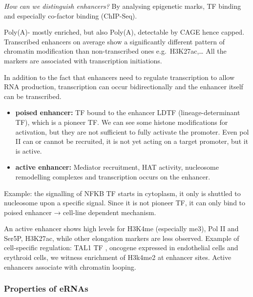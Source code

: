 \emph{How can we distinguish enhancers?} By analysing epigenetic marks, TF binding and especially co-factor binding (ChIP-Seq).

Poly(A)- mostly enriched, but also Poly(A), detectable by CAGE hence capped. Transcribed enhancers on average show a significantly different pattern of chromatin modification than non-transcribed ones e.g.~H3K27ac,\ldots{} All the markers are associated with transcription initiations.

In addition to the fact that enhancers need to regulate transcription to allow RNA production, transcription can occur bidirectionally and the enhancer itself can be transcribed.

\begin{itemize}
\tightlist
\item
  \textbf{poised enhancer:} TF bound to the enhancer LDTF (lineage-determinant TF), which is a pioneer TF. We can see some histone modifications for activation, but they are not sufficient to fully activate the promoter. Even pol II can or cannot be recruited, it is not yet acting on a target promoter, but it is active.
\item
  \textbf{active enhancer:} Mediator recruitment, HAT activity, nucleosome remodelling complexes and transcription occurs on the enhancer.
\end{itemize}

Example: the signalling of NFKB TF starts in cytoplasm, it only is shuttled to nucleosome upon a specific signal. Since it is not pioneer TF, it can only bind to poised enhancer → cell-line dependent mechanism.

An active enhancer shows high levels for H3K4me (especially me3), Pol II and Ser5P, H3K27ac, while other elongation markers are less observed. Example of cell-specific regulation: TAL1 TF , oncogene expressed in endothelial cells and erythroid cells, we witness enrichment of H3k4me2 at enhancer sites. Active enhancers associate with chromatin looping.

\hypertarget{properties-of-ernas}{%
\subsubsection{Properties of eRNAs}\label{properties-of-ernas}}

